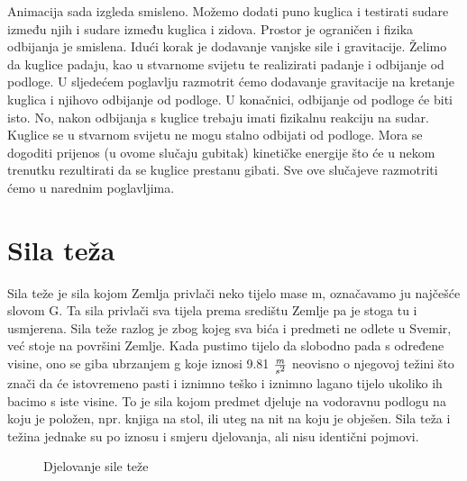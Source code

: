 Animacija sada izgleda smisleno. Možemo dodati puno kuglica i testirati sudare između njih i sudare između kuglica i zidova. Prostor je ograničen i fizika odbijanja je smislena. Idući korak je dodavanje vanjske sile i gravitacije. Želimo da kuglice padaju, kao u stvarnome svijetu te realizirati padanje i odbijanje od podloge. U sljedećem poglavlju razmotrit ćemo dodavanje gravitacije na kretanje kuglica i njihovo odbijanje od podloge. U konačnici, odbijanje od podloge će biti isto. No, nakon odbijanja s kuglice trebaju imati fizikalnu reakciju na sudar. Kuglice se u stvarnom svijetu ne mogu stalno odbijati od podloge. Mora se dogoditi prijenos (u ovome slučaju gubitak) kinetičke energije što će u nekom trenutku rezultirati da se kuglice prestanu gibati. Sve ove slučajeve razmotriti ćemo u narednim poglavljima.\newpage

\section{Sila teža} 
Sila teže je sila kojom Zemlja privlači neko tijelo mase m, označavamo ju najčešće slovom G. Ta sila privlači sva tijela prema središtu Zemlje pa je stoga tu i usmjerena.
Sila teže razlog je zbog kojeg sva bića i predmeti ne odlete u Svemir, već stoje na površini Zemlje.
Kada pustimo tijelo da slobodno pada s određene visine, ono se giba ubrzanjem g koje iznosi 9.81 $\frac{m}{s\textsuperscript{2}}$ neovisno o njegovoj težini što znači da će istovremeno pasti i iznimno teško i iznimno lagano tijelo ukoliko ih bacimo s iste visine. To je sila kojom predmet djeluje na vodoravnu podlogu na koju je položen, npr. knjiga na stol, ili uteg na nit na koju je obješen.
Sila teža i težina jednake su po iznosu i smjeru djelovanja, ali nisu identični pojmovi.

\begin{figure}[!http]
	\begin{center}
	\end{center}
	\caption {Djelovanje sile teže}
	\label{fig:22}
\end{figure}


